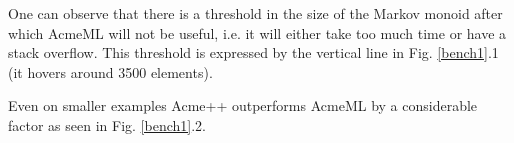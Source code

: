 One can observe that there is a threshold in the size of the Markov
monoid after which AcmeML will not be useful, i.e. it will either take
too much time or have a stack overflow. This threshold is expressed by
the vertical line in Fig. \ref{bench1}.1 (it hovers around 3500 elements).

Even on smaller examples Acme++ outperforms AcmeML by a considerable
factor as seen in Fig. \ref{bench1}.2.
%
